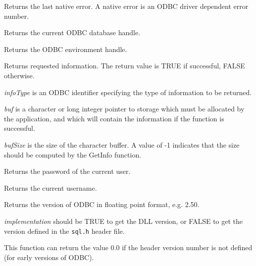 Returns the last native error. A native error is an ODBC driver dependent
error number.



Returns the current ODBC database handle.



Returns the ODBC environment handle. 
  



Returns requested information. The return value is TRUE if successful, FALSE otherwise.

{\it infoType} is an ODBC identifier specifying the type of information to be returned.

{\it buf} is a character or long integer pointer to storage which must be allocated by the
application, and which will contain the information if the function is successful.

{\it bufSize} is the size of the character buffer. A value of -1 indicates that the size
should be computed by the GetInfo function.



Returns the password of the current user.



Returns the current username.



Returns the version of ODBC in floating point format, e.g. 2.50.

{\it implementation} should be TRUE to get the DLL version, or FALSE to get the
version defined in the {\tt sql.h} header file.

This function can return the value 0.0 if the header version number is not defined (for early
versions of ODBC).

